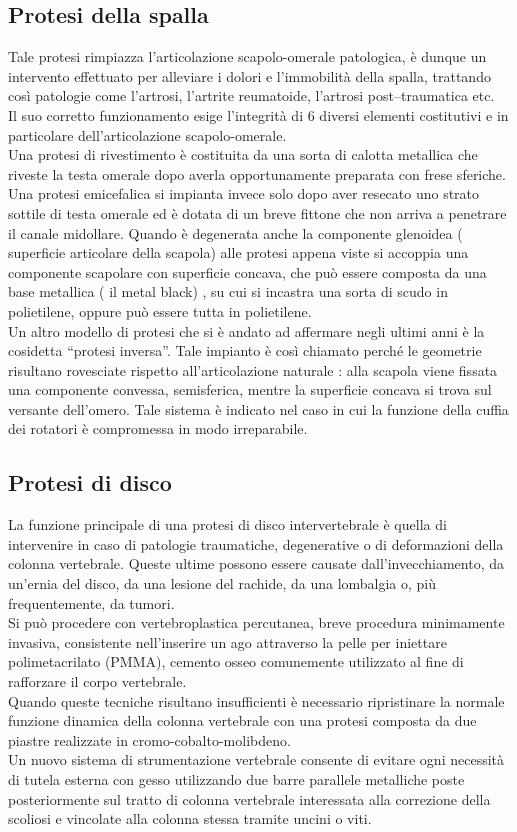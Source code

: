 \documentclass[a4paper]{article}
\begin{document}
\subsection{Protesi della spalla}
Tale protesi rimpiazza l’articolazione scapolo-omerale patologica, è dunque un intervento effettuato per
alleviare i dolori e l’immobilità della spalla, trattando così patologie come l’artrosi, l’artrite reumatoide,
l’artrosi post–traumatica etc. \\
Il suo corretto funzionamento esige
l’integrità di 6 diversi elementi costitutivi e in particolare dell’articolazione scapolo-omerale. \\
Una protesi di rivestimento è costituita da una sorta di calotta metallica che riveste la testa omerale dopo
averla opportunamente preparata con frese sferiche. Una protesi emicefalica si impianta invece solo dopo
aver resecato uno strato sottile di testa omerale ed è dotata di un breve fittone che non arriva a penetrare il
canale midollare. Quando è degenerata anche la componente glenoidea ( superficie articolare della scapola)
alle protesi appena viste si accoppia una componente scapolare con superficie concava, che può essere
composta da una base metallica ( il metal black) , su cui si incastra una sorta di scudo in polietilene, oppure
può essere tutta in polietilene. \\
Un altro modello di protesi che si è andato ad affermare negli ultimi anni è la cosidetta “protesi inversa”. Tale
impianto è così chiamato perché le geometrie risultano rovesciate rispetto all’articolazione naturale : alla
scapola viene fissata una componente convessa, semisferica, mentre la superficie concava si trova sul
versante dell’omero. Tale sistema è indicato nel caso in cui la funzione della cuffia dei rotatori è
compromessa in modo irreparabile.

\subsection{Protesi di disco}
La funzione principale di una protesi di disco intervertebrale è quella di intervenire in caso di patologie
traumatiche, degenerative o di deformazioni della colonna vertebrale. Queste ultime possono essere
causate dall’invecchiamento, da un’ernia del disco, da una lesione del rachide, da una lombalgia o, più
frequentemente, da tumori. \\
Si può procedere
con vertebroplastica percutanea, breve procedura minimamente invasiva, consistente nell’inserire un ago
attraverso la pelle per iniettare polimetacrilato (PMMA), cemento osseo comunemente utilizzato al fine di
rafforzare il corpo vertebrale. \\
Quando queste tecniche risultano insufficienti è necessario ripristinare la
normale funzione dinamica della colonna vertebrale con una protesi composta da due piastre realizzate in
cromo-cobalto-molibdeno. \\
Un nuovo sistema di strumentazione
vertebrale consente di evitare ogni necessità di tutela esterna con gesso utilizzando due barre parallele
metalliche poste posteriormente sul tratto di colonna vertebrale interessata alla correzione della scoliosi e
vincolate alla colonna stessa tramite uncini o viti.
\end{document}
